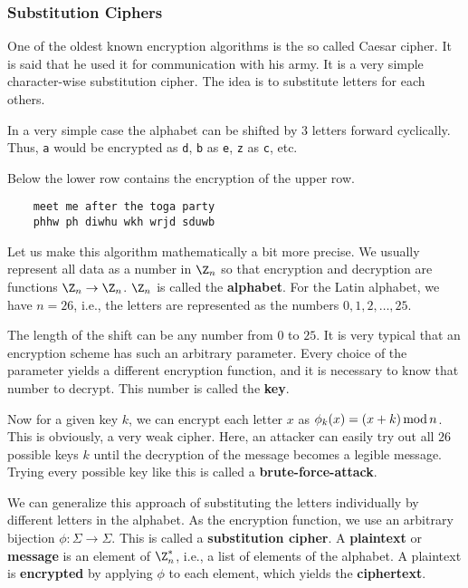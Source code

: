 \subsubsection{Substitution Ciphers}

One of the oldest known encryption algorithms is the so called Caesar cipher. It is said that he used it for communication with his army. It is a very simple character-wise substitution cipher. The idea is to substitute letters for each others.

\begin{example}
 In a very simple case the alphabet can be shifted by $3$ letters forward cyclically.
 Thus, \texttt{a} would be encrypted as \texttt{d}, \texttt{b} as \texttt{e}, \texttt{z} as \texttt{c}, etc.

 Below the lower row contains the encryption of the upper row. 
  \begin{lstlisting}
    meet me after the toga party
    phhw ph diwhu wkh wrjd sduwb
  \end{lstlisting}
\end{example}

Let us make this algorithm mathematically a bit more precise.
We usually represent all data as a number in $\Z_n$ so that encryption and decryption are functions $\Z_n\to\Z_n$.
$\Z_n$ is called the \textbf{alphabet}.
For the Latin alphabet, we have $n=26$, i.e., the letters are represented as the numbers $0, 1, 2,\ldots, 25$.

The length of the shift can be any number from $0$ to $25$.
It is very typical that an encryption scheme has such an arbitrary parameter.
Every choice of the parameter yields a different encryption function, and it is necessary to know that number to decrypt.
This number is called the \textbf{key}.

Now for a given key $k$, we can encrypt each letter $x$ as $\phi_k(x)=(x+k)\mathop{\mathrm{mod}} n$.
This is obviously, a very weak cipher.
Here, an attacker can easily try out all $26$ possible keys $k$ until the decryption of the message becomes a legible message.
Trying every possible key like this is called a \textbf{brute-force-attack}. 

We can generalize this approach of substituting the letters individually by different letters in the alphabet.
As the encryption function, we use an arbitrary bijection $\phi:\Sigma\to\Sigma$.
This is called a \textbf{substitution cipher}.
A \textbf{plaintext} or \textbf{message} is an element of $\Z_n^*$, i.e., a list of elements of the alphabet.
A plaintext is \textbf{encrypted} by applying $\phi$ to each element, which yields the \textbf{ciphertext}.

